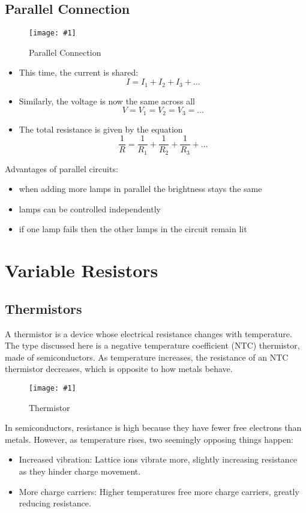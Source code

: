 \documentclass[a4paper,12pt]{article}
\let\oldsection\section
\renewcommand\section{\clearpage\oldsection}
\newcommand{\lb}{\\[8pt]}
\newcommand{\img}[4]{\begin{center}
  \begin{figure}[H]
    \centering
    \texttt{[image: \#1]}
    \caption{#3}
    \label{fig:#4}
  \end{figure}
\end{center}}
\begin{document}
\pagebreak

\subsection{Parallel Connection}
\img{parallel.png}{0.4}{Parallel Connection}{parallel}
\begin{itemize}
  \item This time, the current is shared:
        $$I = I_1 + I_2 + I_3 + \ldots$$
  \item Similarly, the voltage is now the same across all
        $$V = V_1 = V_2 = V_3 = \ldots$$
  \item The total resistance is given by the equation
        $$\frac{1}{R} = \frac{1}{R_1} + \frac{1}{R_2} + \frac{1}{R_3} + \ldots$$
\end{itemize}
Advantages of parallel circuits:
\begin{itemize}
  \item when adding more lamps in parallel the brightness stays the same
  \item lamps can be controlled independently
  \item if one lamp fails then the other lamps in the circuit remain lit
\end{itemize}

\section{Variable Resistors}

\subsection{Thermistors}

A thermistor is a device whose electrical resistance changes with temperature.\lb
The type discussed here is a negative temperature coefficient (NTC) thermistor, made of semiconductors. As temperature increases, the resistance of an NTC thermistor decreases, which is opposite to how metals behave.
\img{thermistor.png}{0.7}{Thermistor}{thermistor}

In semiconductors, resistance is high because they have fewer free electrons than metals. However, as temperature rises, two seemingly opposing things happen:

\begin{itemize}
  \item Increased vibration: Lattice ions vibrate more, slightly increasing resistance as they hinder charge movement.
  \item More charge carriers: Higher temperatures free more charge carriers, greatly reducing resistance.
\end{itemize}
\end{document}
